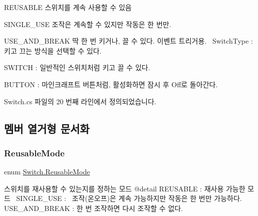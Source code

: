 \begin{DoxyItemize}
\item R\+E\+U\+S\+A\+B\+LE 스위치를 계속 사용할 수 있음~\newline

\item S\+I\+N\+G\+L\+E\+\_\+\+U\+SE 조작은 계속할 수 있지만 작동은 한 번만.~\newline

\item U\+S\+E\+\_\+\+A\+N\+D\+\_\+\+B\+R\+E\+AK 딱 한 번 키거나, 끌 수 있다. 이벤트 트리거용.~\newline
Switch\+Type \+: 키고 끄는 방식을 선택할 수 있다.~\newline

\item S\+W\+I\+T\+CH \+: 일반적인 스위치처럼 키고 끌 수 있다.~\newline

\item B\+U\+T\+T\+ON \+: 마인크래프트 버튼처럼, 활성화하면 잠시 후 Off로 돌아간다. 
\end{DoxyItemize}

Switch.\+cs 파일의 20 번째 라인에서 정의되었습니다.



\subsection{멤버 열거형 문서화}
\mbox{\label{class_switch_ab6cd06c871c19ba8fbe1765515a828cc}} 
\subsubsection{\texorpdfstring{ReusableMode}{ReusableMode}}
{\footnotesize\ttfamily enum \mbox{\hyperlink{class_switch_ab6cd06c871c19ba8fbe1765515a828cc}{Switch.\+Reusable\+Mode}}\hspace{0.3cm}{\ttfamily [strong]}}



스위치를 재사용할 수 있는지를 정하는 모드 @detail R\+E\+U\+S\+A\+B\+LE \+: 재사용 가능한 모드~\newline
S\+I\+N\+G\+L\+E\+\_\+\+U\+SE \+:~\newline
조작(온오프)은 계속 가능하지만 작동은 한 번만 가능하다.~\newline
U\+S\+E\+\_\+\+A\+N\+D\+\_\+\+B\+R\+E\+AK \+: 한 번 조작하면 다시 조작할 수 없다. 

